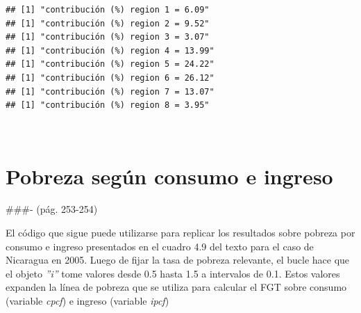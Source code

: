 \documentclass[
]{book}
\begin{document}
\begin{verbatim}
## [1] "contribución (%) region 1 = 6.09"
## [1] "contribución (%) region 2 = 9.52"
## [1] "contribución (%) region 3 = 3.07"
## [1] "contribución (%) region 4 = 13.99"
## [1] "contribución (%) region 5 = 24.22"
## [1] "contribución (%) region 6 = 26.12"
## [1] "contribución (%) region 7 = 13.07"
## [1] "contribución (%) region 8 = 3.95"
\end{verbatim}

~

\hypertarget{pobreza-seguxfan-consumo-e-ingreso}{%
\section{Pobreza según consumo e ingreso}\label{pobreza-seguxfan-consumo-e-ingreso}}

\#\#\#- (pág. 253-254)

El código que sigue puede utilizarse para replicar los resultados sobre pobreza por consumo e ingreso presentados en el cuadro 4.9 del texto para el caso de Nicaragua en 2005. Luego de fijar la tasa de pobreza relevante, el bucle hace que el objeto \emph{''i''} tome valores desde 0.5 hasta 1.5 a intervalos de 0.1. Estos valores expanden la línea de pobreza que se utiliza para calcular el FGT sobre consumo (variable \emph{cpcf}) e ingreso (variable \emph{ipcf})
\end{document}
